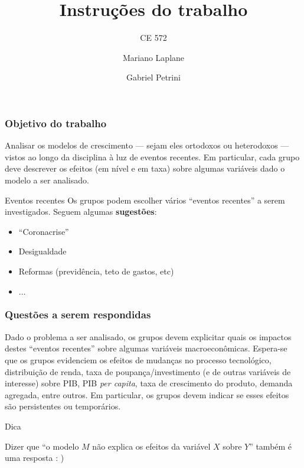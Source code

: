 \documentclass[11pt]{beamer}
\begin{document}
	\author{Mariano Laplane \and Gabriel Petrini}
	\title{Instruções do trabalho}
	\subtitle{CE 572}
	\begin{frame}[plain]
	\maketitle
\end{frame}

\begin{frame}
\frametitle{Objetivo do trabalho}

Analisar os modelos de crescimento --- sejam eles ortodoxos ou heterodoxos --- vistos ao longo da disciplina à luz de eventos recentes. Em particular, cada grupo deve descrever os efeitos (em nível e em taxa) sobre algumas variáveis dado o modelo a ser analisado.

\begin{alertblock}{Eventos recentes}
	Os grupos podem escolher vários ``eventos recentes'' a serem investigados. Seguem  algumas \textbf{sugestões}:
	
	\begin{itemize}
		\item ``Coronacrise''
		\item Desigualdade
		\item Reformas (previdência, teto de gastos, etc)
		\item $\ldots$
	\end{itemize}
\end{alertblock}
\end{frame}

\begin{frame}
\frametitle{Questões a serem respondidas}

Dado o problema a ser analisado, os grupos devem explicitar quais os impactos destes ``eventos recentes'' sobre algumas variáveis macroeconômicas.
Espera-se que os grupos evidenciem os efeitos de mudanças no processo tecnológico, distribuição de renda,  taxa de poupança/investimento (e de outras variáveis de interesse) sobre PIB, PIB \textit{per capita}, taxa de crescimento do produto, demanda agregada, entre outros. Em particular, os grupos devem indicar se esses efeitos são persistentes ou temporários.


\begin{alert}{Dica}
	
	Dizer que ``o modelo $M$ não explica os efeitos da variável $X$ sobre $Y$'' também é uma resposta : )
\end{alert}


\end{frame}
\end{document}

